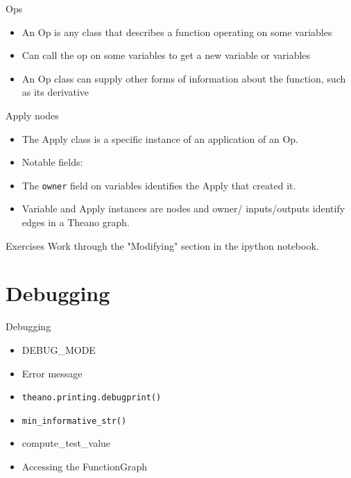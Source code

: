 \documentclass[utf8x,hyperref={pdfpagelabels=false}]{beamer}
\newcommand{\code}[1]{\lstinline[emph={[2]}]|#1|}
\begin{document}
\begin{frame}{Ops}
  \begin{itemize}
  \item  An Op is any class that describes a function operating on some variables
  \item Can call the op on some variables to get a
new variable or variables
  \item An Op class can supply other forms of
information about the function, such as its
derivative
  \end{itemize}
\end{frame}

\begin{frame}{Apply nodes}
  \begin{itemize}
  \item The Apply class is a specific instance of an application of an Op.
  \item Notable fields:
  \item The \code{owner} field on variables identifies the Apply that created it.
  \item Variable and Apply instances are nodes and owner/
    inputs/outputs identify edges in a Theano graph.
  \end{itemize}
\end{frame}

\begin{frame}{Exercises}
Work through the "Modifying" section in the ipython notebook.
\end{frame}

\section{Debugging}
\begin{frame}{Debugging}
  \begin{itemize}
  \item DEBUG\_MODE
  \item Error message
  \item \code{theano.printing.debugprint()}
  \item \code{min_informative_str()}
  \item compute\_test\_value
  \item Accessing the FunctionGraph
  \end{itemize}
\end{frame}
\end{document}
